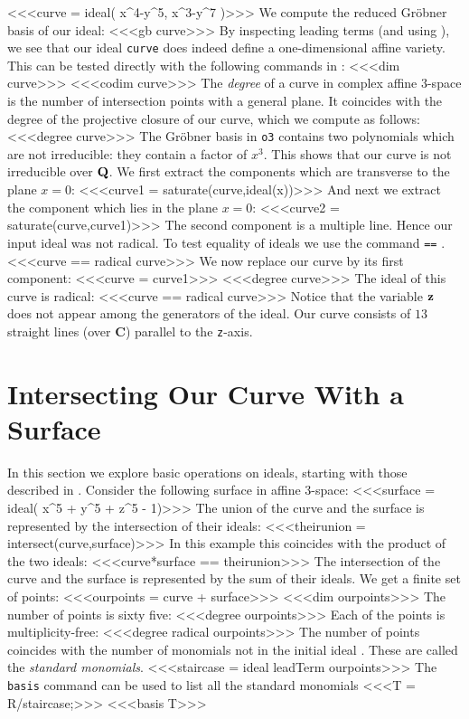 <<<curve = ideal( x^4-y^5, x^3-y^7 )>>>
We compute the reduced Gr\"obner basis of our ideal:
<<<gb curve>>>
By inspecting leading terms (and using \cite[\S 9.3, Theorem 8]{CLO1}),
we see that our ideal {\tt curve} does indeed 
define a one-dimensional affine variety. This can be tested directly
with the following commands in \Mtwo:
<<<dim curve>>>
<<<codim curve>>>
The {\it degree} of a curve in complex affine $3$-space is the 
number of intersection points with a general plane. It coincides
with the degree  \cite[\S 6.4]{CLO2} of the projective closure
\cite[\S 8.4]{CLO1} of our curve, which we compute as follows:
<<<degree curve>>>
The Gr\"obner basis in {\tt o3} contains two polynomials which are not
irreducible: they contain a factor of $x^3$. This shows that our curve
is not irreducible over ${\bf Q}$. We first extract the components
which are transverse to the plane $x=0$:
<<<curve1 = saturate(curve,ideal(x))>>>
And next we extract the component which lies in the plane $x=0$:
<<<curve2 = saturate(curve,curve1)>>>
The second component is a multiple line. Hence our input ideal was not radical.
To test equality of ideals we use the command {\tt ==}\indexcmd{==} .
<<<curve == radical curve>>>
We now replace our curve by its first component:
<<<curve = curve1>>>
<<<degree curve>>>
The ideal of this curve is radical:
<<<curve == radical curve>>>
Notice that the variable ${\bf z}$ does not appear
among the generators of the ideal. Our curve consists of
$13$ straight lines (over {\bf C}) parallel to the {\tt z}-axis.

\section{Intersecting Our Curve With a Surface}

In this section we explore basic operations on ideals,
starting with those described in \cite[\S 4.3]{CLO1}.
Consider the following surface in affine $3$-space:
<<<surface = ideal( x^5 + y^5 + z^5 - 1)>>>
The union of the curve and the surface is represented by the 
intersection of their ideals:
<<<theirunion = intersect(curve,surface)>>>
In this example this coincides with the product of the two ideals:
<<<curve*surface == theirunion>>>
The intersection of the curve and the surface is represented by the 
sum of their ideals. We get a finite set of points:
<<<ourpoints = curve + surface>>>
<<<dim ourpoints>>>
The number of points is sixty five:
<<<degree ourpoints>>>
Each of the points is multiplicity-free:
<<<degree radical ourpoints>>>
The number of points coincides with the number of 
monomials not in the initial ideal \cite[\S 2.2]{CLO2}.
These are called the {\it standard monomials}.
<<<staircase = ideal leadTerm ourpoints>>>
The {\tt basis} command can be used to list all the standard monomials
<<<T = R/staircase;>>>
<<<basis T>>>

